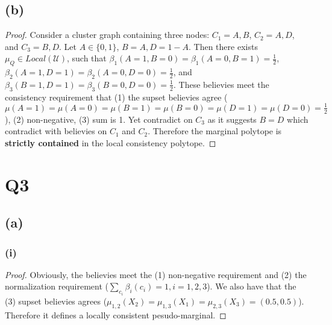 \documentclass{article}
\begin{document}
\subsection*{(b)}
\begin{proof}
    Consider a cluster graph containing three nodes: $C_1 = {A, B}$, $C_2 = {A, D}$, and $C_3 = {B, D}$. Let $A \in \{0, 1\}$, $B = A, D = 1 - A$.
    Then there exists $\mu_Q \in Local(\mathcal{U})$, such that $\beta_1(A=1, B=0)=\beta_1(A=0, B=1)=\frac{1}{2}$, $\beta_2(A=1, D=1)=\beta_2(A=0, D=0)=\frac{1}{2}$, 
    and $\beta_3(B=1, D=1)=\beta_3(B=0, D=0)=\frac{1}{2}$. These believies meet the consistency requirement that (1) the supset believies agree ($\mu(A = 1) = \mu(A = 0) = \mu(B = 1) = \mu(B = 0) = \mu(D = 1) = \mu(D = 0) = \frac{1}{2}$), (2) non-negative, (3) sum is 1. 
    Yet contradict on $C_3$ as it suggests $B = D$ which contradict with believies on $C_1$ and $C_2$.
    Therefore the marginal polytope is \textbf{strictly contained} in the local consistency polytope.
\end{proof}

\section*{Q3}
\subsection*{(a)}
\subsubsection{(i)}
\begin{proof}
    Obviously, the believies meet the (1) non-negative requirement and (2) the normalization requirement ($\sum_{c_i}\beta_i(c_i) = 1, i=1,2,3$). We also have that the (3) supset believies agrees 
    ($\mu_{1,2} (X_2) = \mu_{1,3} (X_1) = \mu_{2,3} (X_3) = (0.5,0.5)$). Therefore it defines a locally consistent pesudo-marginal.
\end{proof}
\end{document}
